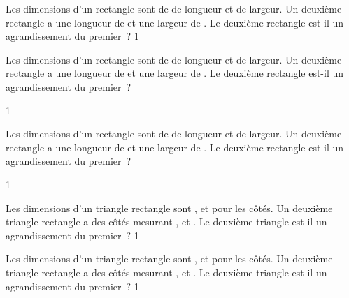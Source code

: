 \documentclass[a4paper,11pt]{report}
\begin{document}
\begin{exo} %
	{Les dimensions d'un rectangle sont de  de longueur et  de largeur. Un deuxième rectangle a une longueur de  et une largeur de . Le deuxième rectangle est-il un agrandissement du premier~?
}{1}
\end{exo}

\begin{exo} %
	{Les dimensions d'un rectangle sont de  de longueur et  de largeur. Un deuxième rectangle a une longueur de  et une largeur de . Le deuxième rectangle est-il un agrandissement du premier~?

}{1}
\end{exo}

\begin{exo} %
	{Les dimensions d'un rectangle sont de  de longueur et  de largeur. Un deuxième rectangle a une longueur de  et une largeur de . Le deuxième rectangle est-il un agrandissement du premier~?

}{1}
\end{exo}


\begin{exo} %
	{Les dimensions d'un triangle rectangle sont ,  et  pour les côtés. Un deuxième triangle rectangle a des côtés mesurant ,  et . Le deuxième triangle est-il un agrandissement du premier~?
}{1}
\end{exo}


\begin{exo} %
	{Les dimensions d'un triangle rectangle sont ,  et  pour les côtés. Un deuxième triangle rectangle a des côtés mesurant ,  et . Le deuxième triangle est-il un agrandissement du premier~?
}{1}
\end{exo}

\end{document}
